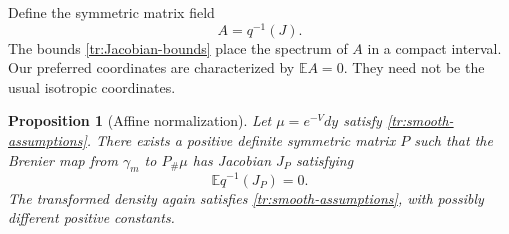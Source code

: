\documentclass[11pt]{article}
\newtheorem{proposition}[theorem]{Proposition}
\theoremstyle{definition}
\theoremstyle{remark}
\numberwithin{equation}{section}
\begin{document}
Define the symmetric matrix field
\begin{equation}\label{tr:A-definition}
 A=q^{-1}(J).
\end{equation}
The bounds \eqref{tr:Jacobian-bounds} place the spectrum of $A$ in a
compact interval.  Our preferred coordinates are characterized by
$\mathbb EA=0$.  They need not be the usual isotropic coordinates.

\begin{proposition}[Affine normalization]\label{tr:normalization}
Let $\mu=e^{-V}dy$ satisfy \eqref{tr:smooth-assumptions}.  There exists a
positive definite symmetric matrix $P$ such that the Brenier map from
$\gamma_m$ to $P_\#\mu$ has Jacobian $J_P$ satisfying
\[
 \mathbb E q^{-1}(J_P)=0.
\]
The transformed density again satisfies
\eqref{tr:smooth-assumptions}, with possibly different positive constants.
\end{proposition}
\end{document}
